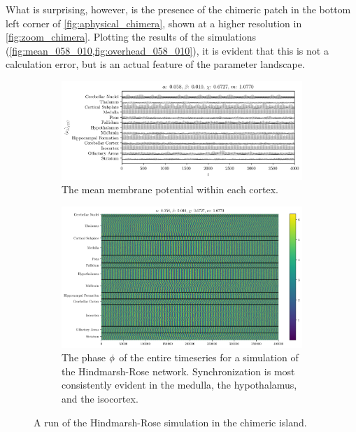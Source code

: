 What is surprising, however, is the presence of the chimeric patch in the bottom left corner of \cref{fig:aphysical_chimera}, shown at a higher resolution in \cref{fig:zoom_chimera}.
Plotting the results of the simulations (\cref{fig:mean_058_010,fig:overhead_058_010}),
it is evident that this is not a calculation error, but is an actual feature of the parameter landscape.
\begin{figure}[ht]
  \centering
  \begin{subfigure}{\textwidth}
    \includegraphics[width=\textwidth]{figure/means-0_058-0_010}
    \caption{The mean membrane potential within each cortex.}
    \label{fig:mean_058_010}
  \end{subfigure}
  \begin{subfigure}{\textwidth}
    \includegraphics[width=\textwidth]{figure/overhead-0_058-0_010}
    \caption{The phase $\phi$ of the entire timeseries for a simulation of the Hindmarsh-Rose network.
      Synchronization is most consistently evident in the medulla, the hypothalamus, and the isocortex.
    }
    \label{fig:overhead_058_010}
  \end{subfigure}
  \caption[Highly chimeric simulation]{A run of the Hindmarsh-Rose simulation in the chimeric island.}
  \label{fig:058_010}
\end{figure}

